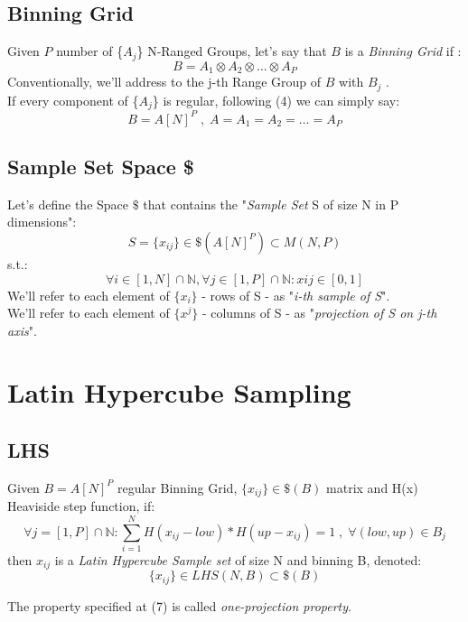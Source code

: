\documentclass{article}
\begin{document}
\subsection{Binning Grid}
Given $P$ number of \{$A_j$\} N-Ranged Groups, let's say that $B$ is a \textit{Binning Grid} if : 
\begin{equation}
B = A_1 \otimes A_2 \otimes \ldots \otimes A_P
\end{equation}
Conventionally, we'll address to the j-th Range Group of $B$ with $B_j$ . \\
If every component of \{$A_j$\} is regular, following (4) we can simply say:
\begin{equation*}
B = A[N]^P \; , \; A = A_1 = A_2 = \ldots = A_P
\end{equation*}

\subsection{Sample Set Space \$}
Let's define the Space $\$$ that contains the "\textit{Sample Set} S of size N in P dimensions":
\begin{equation*}
S = \{x_{ij}\}\in \$(A[N]^P) \subset M(N, P) 
\end{equation*}
s.t.: 
\begin{equation} 
\forall i \in [1,N] \cap \mathbb{N}, \forall j \in [1, P] \cap \mathbb{N} : xij \in [0,1]
\end{equation}
We'll refer to each element of $\{x_i\}$ - rows of S - as "\textit{i-th sample of S}".\\
We'll refer to each element of $\{x^j\}$ - columns of S - as "\textit{projection of S on j-th axis}".


\section{Latin Hypercube Sampling}
\subsection{LHS}
Given $B = A[N]^P$ regular Binning Grid, $\{x_{ij}\} \in \$(B)$ matrix and H(x) Heaviside step function, if:
\begin{equation}
\forall j = [1, P] \cap \mathbb{N} :
\sum^N_{i=1} H(x_{ij} - low) * H(up - x_{ij}) = 1 \; , \; \forall (low, up) \in B_j
\end{equation}
then ${x_{ij}}$ is a \textit{Latin Hypercube Sample set} of size N and binning B, denoted:
\begin{equation}
\{x_{ij}\} \in LHS(N, B) \subset \$(B)
\end{equation}
\begin{scriptsize}
The property specified at (7) is called \textit{one-projection property}.
\end{scriptsize}
\end{document}
